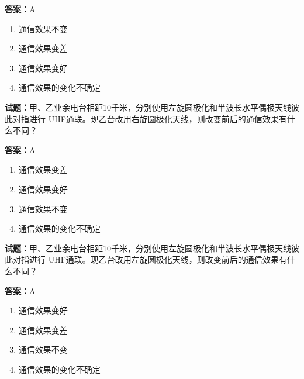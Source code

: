 \documentclass{ctexbook}
\begin{document}
\textbf{答案：}A 

\begin{enumerate}[leftmargin=3em]
  \item 通信效果不变 

  \item 通信效果变差 

  \item 通信效果变好 

  \item 通信效果的变化不确定 

\end{enumerate}





\vspace{1em}

\textbf{试题：}甲、乙业余电台相距10千米，分别使用左旋圆极化和半波长水平偶极天线彼此对指进行
UHF通联。现乙台改用右旋圆极化天线，则改变前后的通信效果有什么不同？ 

\textbf{答案：}A 

\begin{enumerate}[leftmargin=3em]
  \item 通信效果变差 

  \item 通信效果变好 

  \item 通信效果不变 

  \item 通信效果的变化不确定 

\end{enumerate}





\vspace{1em}

\textbf{试题：}甲、乙业余电台相距10千米，分别使用左旋圆极化和半波长水平偶极天线彼此对指进行
UHF通联。现乙台改用左旋圆极化天线，则改变前后的通信效果有什么不同？ 

\textbf{答案：}A 

\begin{enumerate}[leftmargin=3em]
  \item 通信效果变好 

  \item 通信效果变差 

  \item 通信效果不变 

  \item 通信效果的变化不确定 

\end{enumerate}
\end{document}
